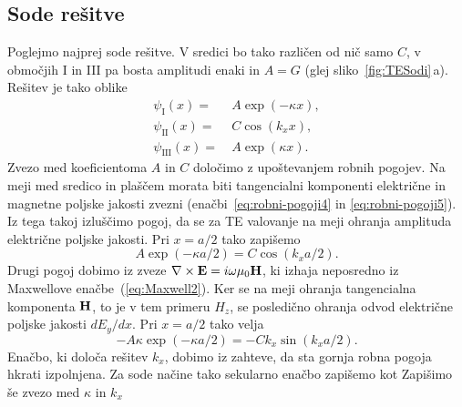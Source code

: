 \subsection*{Sode rešitve}
Poglejmo najprej sode rešitve. V sredici bo tako različen od nič samo $C$, 
v območjih I in III pa bosta amplitudi enaki in $A = G$ (glej sliko~\ref{fig:TESodi}\,a). 
Rešitev je tako oblike 
\begin{align}
\psi_{\mathrm{I}}(x) =&~ A \exp(-\kappa x), \\
\psi_{\mathrm{II}}(x) =&~ C \cos(k_x x),\\
\psi_{\mathrm{III}}(x) =&~ A \exp(\kappa x).
\end{align}
Zvezo med koeficientoma $A$ in $C$ določimo z upoštevanjem robnih pogojev. Na meji
med sredico in plaščem morata biti tangencialni komponenti 
električne in magnetne poljske jakosti zvezni (enačbi~\ref{eq:robni-pogoji4} in 
\ref{eq:robni-pogoji5}). Iz tega takoj 
izluščimo pogoj, da se za TE valovanje
na meji ohranja amplituda električne poljske jakosti. Pri $x = a/2$ tako zapišemo
\begin{equation}
A \exp(-\kappa a/2) = C \cos(k_x a/2).
\end{equation}
Drugi pogoj dobimo iz zveze $\nabla\times{\bf E}=i\omega\mu_{0}{\bf H}$, ki izhaja
neposredno iz Maxwellove enačbe~(\ref{eq:Maxwell2}). Ker se na meji ohranja
tangencialna komponenta ${\bf H}$, to je v tem primeru $H_z$, se posledično ohranja 
odvod električne poljske jakosti $dE_y/dx$. 
Pri $x = a/2$ tako velja
\begin{equation}
-A \kappa \exp(-\kappa a/2) = -C k_x \sin(k_x a/2).
\end{equation}
Enačbo, ki določa rešitev $k_x$, dobimo iz zahteve, da sta gornja robna 
pogoja hkrati izpolnjena. Za sode načine tako sekularno enačbo zapišemo kot
Zapišimo še zvezo med $\kappa$ in $k_x$ 


